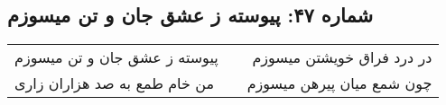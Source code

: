 \begin{center}
\section*{شماره ۴۷: پیوسته ز عشق جان و تن میسوزم}
\label{sec:047}
\begin{longtable}{l p{0.5cm} r}
پیوسته ز عشق جان و تن میسوزم
&&
در درد فراق خویشتن میسوزم
\\
من خام طمع به صد هزاران زاری
&&
چون شمع میان پیرهن میسوزم
\\
\end{longtable}
\end{center}
